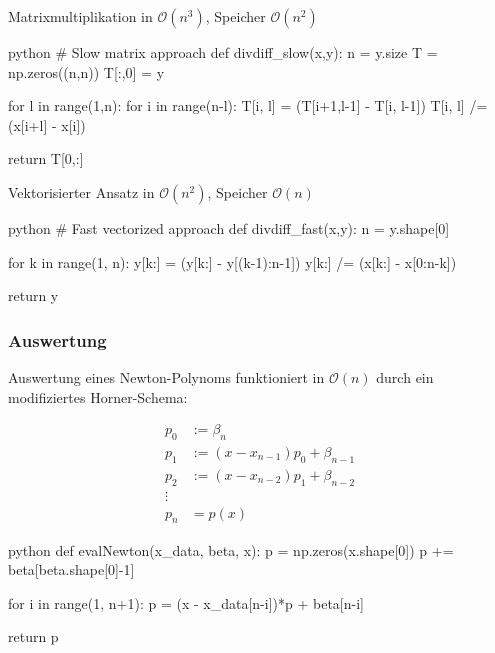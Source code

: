 \newpage
\begin{multicols}{2}

    Matrixmultiplikation in $\mathcal{O}(n^3)$, Speicher $\mathcal{O}(n^2)$

    \begin{code}{python}
    # Slow matrix approach
    def divdiff_slow(x,y):
        n = y.size
        T = np.zeros((n,n))
        T[:,0] = y

        for l in range(1,n):
            for i in range(n-l):
                T[i, l] = (T[i+1,l-1] - T[i, l-1])
                T[i, l] /= (x[i+l] - x[i])
        
        return T[0,:]
    \end{code}

    \newcolumn


    Vektorisierter Ansatz in $\mathcal{O}(n^2)$, Speicher $\mathcal{O}(n)$

    \begin{code}{python}
    # Fast vectorized approach
    def divdiff_fast(x,y):
        n = y.shape[0]

        for k in range(1, n):
            y[k:] = (y[k:] - y[(k-1):n-1]) 
            y[k:] /= (x[k:] - x[0:n-k])
    
        return y
    \end{code}

\end{multicols}

\subsubsection{Auswertung}

Auswertung eines Newton-Polynoms funktioniert in $\mathcal{O}(n)$ durch ein modifiziertes Horner-Schema:

\begin{multicols}{2}
    
\begin{align*}
    p_0 &:= \beta_n \\
    p_1 &:= (x - x_{n-1})p_0 + \beta_{n-1} \\
    p_2 &:= (x - x_{n-2})p_1 + \beta_{n-2} \\
    \vdots \\
    p_n &= p(x)
\end{align*}

\newcolumn

\begin{code}{python}
    def evalNewton(x_data, beta, x):
        p = np.zeros(x.shape[0])
        p += beta[beta.shape[0]-1]
    
        for i in range(1, n+1):
            p = (x - x_data[n-i])*p + beta[n-i]
      
        return p
\end{code}

\end{multicols}


